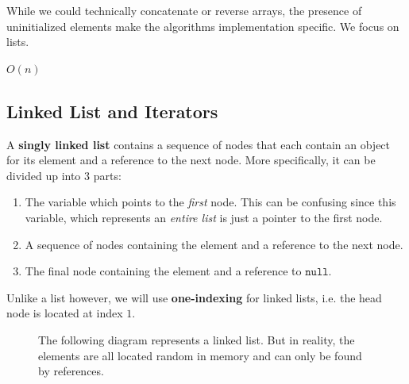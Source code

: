   While we could technically concatenate or reverse arrays, the presence of uninitialized elements make the algorithms implementation specific. We focus on lists. 

  \begin{algo}
    
  \end{algo}

  \begin{algo}
    $O(n)$
  \end{algo}

\subsection{Linked List and Iterators}

  \begin{definition}
    \label{def:singly-linked-list}
    A \textbf{singly linked list} contains a sequence of nodes that each contain an object for its element and a reference to the next node. More specifically, it can be divided up into 3 parts: 
    \begin{enumerate}
      \item The variable which points to the \textit{first} node. This can be confusing since this variable, which represents an \textit{entire list} is just a pointer to the first node. 
      \item A sequence of nodes containing the element and a reference to the next node. 
      \item The final node containing the element and a reference to $\texttt{null}$. 
    \end{enumerate}
    Unlike a list however, we will use \textbf{one-indexing} for linked lists, i.e. the head node is located at index $1$. 

    \begin{figure}[H]
      \centering 
      \caption{The following diagram represents a linked list. But in reality, the elements are all located random in memory and can only be found by references. } 
      \label{fig:linked_list}
    \end{figure}
  \end{definition}

